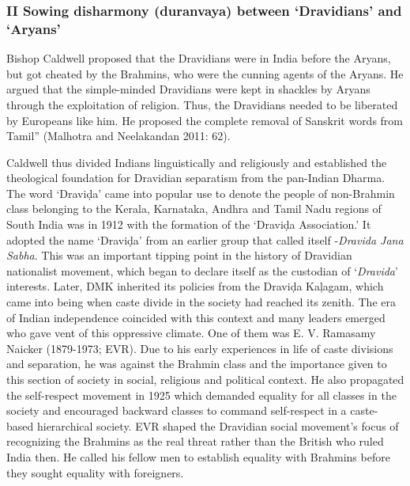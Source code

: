 \subsubsection*{II Sowing disharmony (duranvaya) between ‘Dravidians’ and ‘Aryans’ }

\begin{myquote}
Bishop Caldwell proposed that the Dravidians were in India before the Aryans, but got cheated by the Brahmins, who were the cunning agents of the Aryans. He argued that the simple-minded Dravidians were kept in shackles by Aryans through the exploitation of religion. Thus, the Dravidians needed to be liberated by Europeans like him. He proposed the complete removal of Sanskrit words from Tamil” (Malhotra and Neelakandan 2011: 62).
\end{myquote}

Caldwell thus divided Indians linguistically and religiously and established the theological foundation for Dravidian separatism from the pan-Indian Dharma. The word ‘Draviḍa’ came into popular use to denote the people of non-Brahmin class belonging to the Kerala, Karnataka, Andhra and Tamil Nadu regions of South India was in 1912 with the formation of the ‘Draviḍa Association.’ It adopted the name ‘Draviḍa’ from an earlier group that called itself -\textit{Dravida Jana Sabha}. This was an important tipping point in the history of Dravidian nationalist movement, which began to declare itself as the custodian of ‘\textit{Dravida}’ interests. Later, DMK inherited its policies from the Draviḍa Kaļagam, which came into being when caste divide in the society had reached its zenith. The era of Indian independence coincided with this context and many leaders emerged who gave vent of this oppressive climate. One of them was E. V. Ramasamy Naicker (1879-1973; EVR). Due to his early experiences in life of caste divisions and separation, he was against the Brahmin class and the importance given to this section of society in social, religious and political context. He also propagated the self-respect movement in 1925 which demanded equality for all classes in the society and encouraged backward classes to command self-respect in a caste-based hierarchical society. EVR shaped the Dravidian social movement’s focus of recognizing the Brahmins as the real threat rather than the British who ruled India then. He called his fellow men to establish equality with Brahmins before they sought equality with foreigners.

